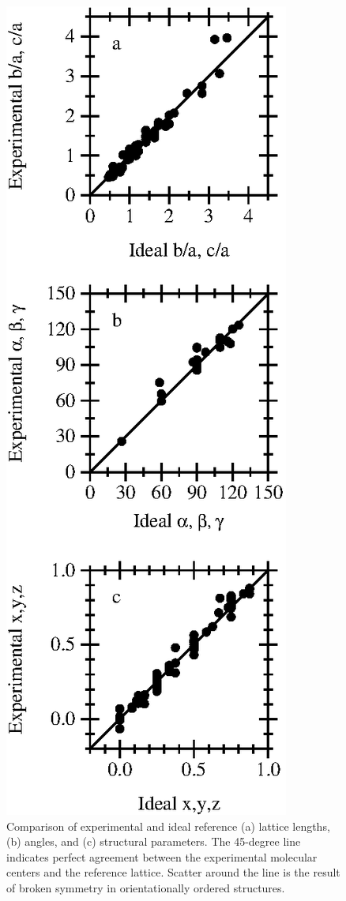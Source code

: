 \documentclass[preprint]{revtex4}              %
\begin{document}
\begin{figure}
\begin{center}
\includegraphics{compare2EPS.eps}
\end{center}
\caption[Comparison of experimental and ideal reference
structures.]{Comparison of experimental and ideal reference (a)
lattice lengths, (b) angles, and (c) structural parameters. The
45-degree line indicates perfect agreement between the experimental
molecular centers and the reference lattice. Scatter around the line
is the result of broken symmetry in orientationally ordered
structures.} \label{comparison}
\end{figure}
\end{document}
